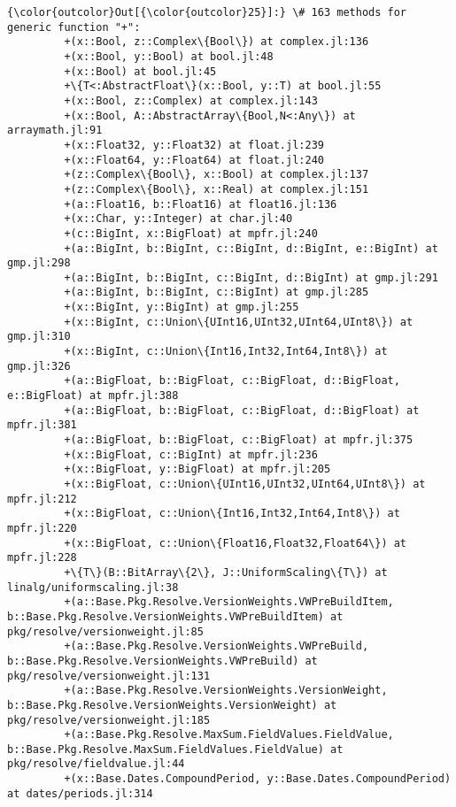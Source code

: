 \documentclass[11pt]{article}
\begin{document}
            \begin{Verbatim}[commandchars=\\\{\}]
{\color{outcolor}Out[{\color{outcolor}25}]:} \# 163 methods for generic function "+":
         +(x::Bool, z::Complex\{Bool\}) at complex.jl:136
         +(x::Bool, y::Bool) at bool.jl:48
         +(x::Bool) at bool.jl:45
         +\{T<:AbstractFloat\}(x::Bool, y::T) at bool.jl:55
         +(x::Bool, z::Complex) at complex.jl:143
         +(x::Bool, A::AbstractArray\{Bool,N<:Any\}) at arraymath.jl:91
         +(x::Float32, y::Float32) at float.jl:239
         +(x::Float64, y::Float64) at float.jl:240
         +(z::Complex\{Bool\}, x::Bool) at complex.jl:137
         +(z::Complex\{Bool\}, x::Real) at complex.jl:151
         +(a::Float16, b::Float16) at float16.jl:136
         +(x::Char, y::Integer) at char.jl:40
         +(c::BigInt, x::BigFloat) at mpfr.jl:240
         +(a::BigInt, b::BigInt, c::BigInt, d::BigInt, e::BigInt) at gmp.jl:298
         +(a::BigInt, b::BigInt, c::BigInt, d::BigInt) at gmp.jl:291
         +(a::BigInt, b::BigInt, c::BigInt) at gmp.jl:285
         +(x::BigInt, y::BigInt) at gmp.jl:255
         +(x::BigInt, c::Union\{UInt16,UInt32,UInt64,UInt8\}) at gmp.jl:310
         +(x::BigInt, c::Union\{Int16,Int32,Int64,Int8\}) at gmp.jl:326
         +(a::BigFloat, b::BigFloat, c::BigFloat, d::BigFloat, e::BigFloat) at mpfr.jl:388
         +(a::BigFloat, b::BigFloat, c::BigFloat, d::BigFloat) at mpfr.jl:381
         +(a::BigFloat, b::BigFloat, c::BigFloat) at mpfr.jl:375
         +(x::BigFloat, c::BigInt) at mpfr.jl:236
         +(x::BigFloat, y::BigFloat) at mpfr.jl:205
         +(x::BigFloat, c::Union\{UInt16,UInt32,UInt64,UInt8\}) at mpfr.jl:212
         +(x::BigFloat, c::Union\{Int16,Int32,Int64,Int8\}) at mpfr.jl:220
         +(x::BigFloat, c::Union\{Float16,Float32,Float64\}) at mpfr.jl:228
         +\{T\}(B::BitArray\{2\}, J::UniformScaling\{T\}) at linalg/uniformscaling.jl:38
         +(a::Base.Pkg.Resolve.VersionWeights.VWPreBuildItem, b::Base.Pkg.Resolve.VersionWeights.VWPreBuildItem) at pkg/resolve/versionweight.jl:85
         +(a::Base.Pkg.Resolve.VersionWeights.VWPreBuild, b::Base.Pkg.Resolve.VersionWeights.VWPreBuild) at pkg/resolve/versionweight.jl:131
         +(a::Base.Pkg.Resolve.VersionWeights.VersionWeight, b::Base.Pkg.Resolve.VersionWeights.VersionWeight) at pkg/resolve/versionweight.jl:185
         +(a::Base.Pkg.Resolve.MaxSum.FieldValues.FieldValue, b::Base.Pkg.Resolve.MaxSum.FieldValues.FieldValue) at pkg/resolve/fieldvalue.jl:44
         +(x::Base.Dates.CompoundPeriod, y::Base.Dates.CompoundPeriod) at dates/periods.jl:314

\end{Verbatim}
\end{document}
